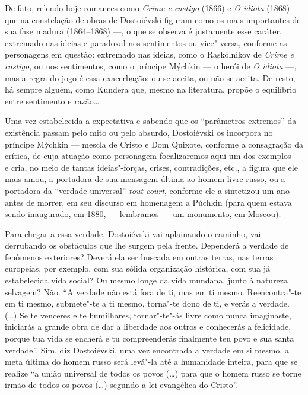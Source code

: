 De fato, relendo hoje romances como \emph{Crime e castigo} (1866)
e \emph{O idiota} (1868) --- que na constelação de obras de Dostoiévski
figuram como os mais importantes de sua fase madura (1864--1868) ---, o que se observa é justamente esse caráter, extremado nas ideias e
paradoxal nos sentimentos ou vice"-versa, conforme as personagens em
questão: extremado nas ideias, como o Raskólnikov
de \emph{Crime e castigo}, ou nos sentimentos, como o príncipe
Mýchkin --- o herói de \emph{O idiota} ---, mas a regra do jogo é essa
exacerbação: ou se aceita, ou não se aceita. De resto, há sempre alguém,
como Kundera que, mesmo na literatura, propõe o equilíbrio entre
sentimento e razão\ldots{}

Uma vez estabelecida a expectativa e sabendo que os ``parâmetros
extremos'' da existência passam pelo mito ou pelo absurdo, Dostoiévski
os incorpora no príncipe Mýchkin --- mescla de Cristo e Dom Quixote,
conforme a consagração da crítica, de cuja atuação como personagem
focalizaremos aqui um dos exemplos --- e cria, no meio de tantas
ideias"-forças, crises, contradições, etc., a figura que ele mais amou,
a portadora de sua mensagem última ao homem livre russo, ou
a portadora da ``verdade universal'' \emph{tout court}, conforme ele a
sintetizou um ano antes de morrer, em seu discurso em homenagem a
Púchkin (para quem estava sendo inaugurado, em 1880, --- lembramos --- um monumento, em
Moscou).

Para chegar a essa verdade, Dostoiévski vai aplainando o caminho, vai
derrubando os obstáculos que lhe surgem pela frente. Dependerá a verdade
de fenômenos exteriores? Deverá ela ser buscada em outras terras, nas
terras europeias, por exemplo, com sua sólida organização histórica, com
sua já estabelecida vida social? Ou mesmo longe da vida mundana, junto à
natureza selvagem? Não. ``A verdade não está fora de ti, mas em ti
mesmo. Reencontra"-te em ti mesmo, submete"-te a ti mesmo, torna"-te dono
de ti, e verás a verdade. (\ldots{}) Se te venceres e te humilhares,
tornar"-te"-ás livre como nunca imaginaste, iniciarás a grande obra de
dar a liberdade aos outros e conhecerás a felicidade, porque tua vida se
encherá e tu compreenderás finalmente teu povo e sua santa verdade''.
Sim, diz Dostoiévski, uma vez encontrada a verdade em si mesmo, a meta
última do homem russo será levá"-la até a humanidade inteira, para que se
realize ``a união universal de todos os povos (\ldots{}) para que o homem
russo se torne irmão de todos os povos (\ldots{}) segundo a lei evangélica do
Cristo''.

